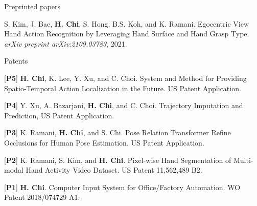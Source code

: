 \begin{cventries}
\cvpub
{Preprinted papers} %
{
\begin{cvitems}
    \item {S. Kim, J. Bae, \textbf{H. Chi}, S. Hong, B.S. Koh, and K. Ramani. Egocentric View Hand Action Recognition by Leveraging Hand Surface and Hand Grasp Type. \textit{arXiv preprint arXiv:2109.03783}, 2021. }
\end{cvitems}
}



\cvpub
{Patents}{
\begin{cvitems}
    \item {[\textbf{P5}] \textbf{H. Chi}, K. Lee, Y. Xu, and C. Choi. System and Method for Providing Spatio-Temporal Action Localization in the Future. US Patent Application.}
    \item {[\textbf{P4}] Y. Xu, A. Bazarjani, \textbf{H. Chi}, and C. Choi. Trajectory Imputation and Prediction, US Patent Application.}
    \item {[\textbf{P3}] K. Ramani, \textbf{H. Chi}, and S. Chi. Pose Relation Transformer Refine Occlusions for Human Pose Estimation. US Patent Application.}
    \item {[\textbf{P2}] K. Ramani, S. Kim, and \textbf{H. Chi}. Pixel-wise Hand Segmentation of Multi-modal Hand Activity Video Dataset. US Patent 11,562,489 B2.}
    \item {[\textbf{P1}] \textbf{H. Chi}. Computer Input System for Office/Factory Automation. WO Patent 2018/074729 A1.}
\end{cvitems}
}



\end{cventries}

